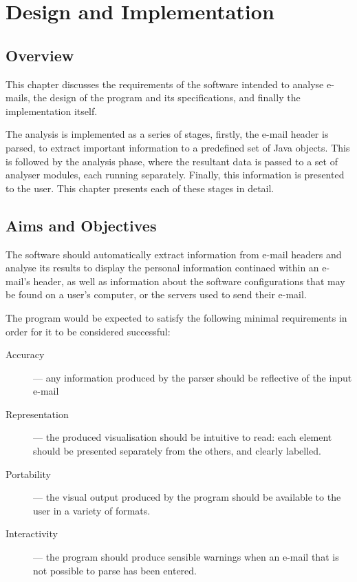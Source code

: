 \chapter{Design and Implementation}\label{chap:imp}

\section{Overview}

This chapter discusses the requirements of the software intended to analyse e-mails, the design of the program and its specifications, and finally the implementation itself.

The  analysis is implemented as a series of stages, firstly, the e-mail header
is parsed, to extract important information to a predefined set of Java objects.
This is followed by the analysis phase, where the resultant data is passed to a
set of analyser modules, each running separately.  Finally, this information is
presented to the user.  This chapter presents each of these stages in detail.

    \section{Aims and Objectives}

    The software should
    automatically extract information from e-mail headers and analyse its results to
    display the personal information continaed within an e-mail's header, as well as
    information about the software configurations that may be found on a user's
    computer, or the servers used to send their e-mail.

    The program would be expected to satisfy the following minimal requirements
    in order for it to be considered successful: \begin{description} \item
    [{Accuracy}] --- any information produced by the parser should be reflective
    of the input e-mail

    \item [{Representation}] --- the produced visualisation should be intuitive
    to read: each element should be presented separately from the others, and
    clearly labelled.

    \item [{Portability}] --- the visual output produced by the program should
    be available to the user in a variety of formats.

    \item [{Interactivity}] --- the program should produce sensible warnings
    when an e-mail that is not possible to parse has been entered.
  \end{description}

